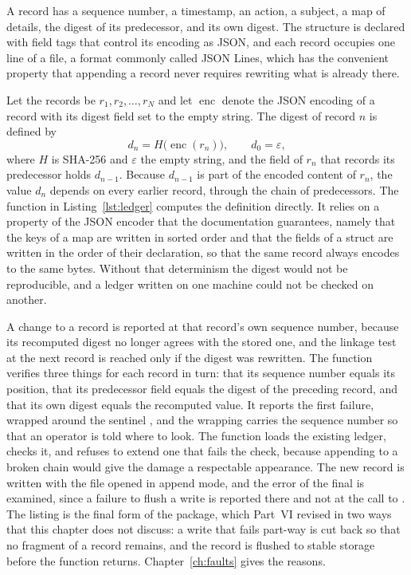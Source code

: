 A record has a sequence number, a timestamp, an action, a subject, a map of details, the digest of its predecessor, and its own digest. The structure is declared with field tags that control its encoding as JSON, and each record occupies one line of a file, a format commonly called JSON Lines, which has the convenient property that appending a record never requires rewriting what is already there.


Let the records be $r_1, r_2, \ldots, r_N$ and let $\operatorname{enc}$ denote the JSON encoding of a record with its digest field set to the empty string. The digest of record $n$ is defined by
\[
d_n = H\bigl(\operatorname{enc}(r_n)\bigr), \qquad d_0 = \varepsilon,
\]
where $H$ is SHA-256 and $\varepsilon$ the empty string, and the field of $r_n$ that records its predecessor holds $d_{n-1}$. Because $d_{n-1}$ is part of the encoded content of $r_n$, the value $d_n$ depends on every earlier record, through the chain of predecessors. The function  in Listing~\ref{lst:ledger} computes the definition directly. It relies on a property of the JSON encoder that the documentation guarantees, namely that the keys of a map are written in sorted order and that the fields of a struct are written in the order of their declaration, so that the same record always encodes to the same bytes. Without that determinism the digest would not be reproducible, and a ledger written on one machine could not be checked on another.

A change to a record is reported at that record's own sequence number, because its recomputed digest no longer agrees with the stored one, and the linkage test at the next record is reached only if the digest was rewritten. The function  verifies three things for each record in turn: that its sequence number equals its position, that its predecessor field equals the digest of the preceding record, and that its own digest equals the recomputed value. It reports the first failure, wrapped around the sentinel , and the wrapping carries the sequence number so that an operator is told where to look. The function  loads the existing ledger, checks it, and refuses to extend one that fails the check, because appending to a broken chain would give the damage a respectable appearance. The new record is written with the file opened in append mode, and the error of the final  is examined, since a failure to flush a write is reported there and not at the call to . The listing is the final form of the package, which Part~VI revised in two ways that this chapter does not discuss: a write that fails part-way is cut back so that no fragment of a record remains, and the record is flushed to stable storage before the function returns. Chapter~\ref{ch:faults} gives the reasons.


